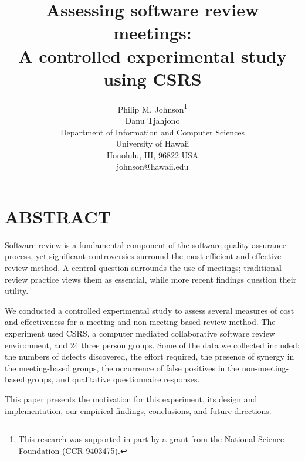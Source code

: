 



\title{Assessing software review meetings: \\ A controlled experimental study using CSRS}

\author{
        \hspace*{-4ex}
        \parbox{4.6in} {\begin{center}
        {\authornamefont Philip M. Johnson\thanks{This research was supported
in part by a grant  from the National Science Foundation (CCR-9403475).}}\\ 
        {\authornamefont Danu Tjahjono}\\
        Department of Information and Computer Sciences\\
        University of Hawaii\\
        Honolulu, HI, 96822 USA\\
        johnson@hawaii.edu
        \end{center} }
      }

\maketitle
\copyrightspace
\section{ABSTRACT}

Software review is a fundamental component of the software quality
assurance process, yet significant controversies surround the 
most efficient and effective review method. A central question
surrounds the use of meetings; traditional review practice views
them as essential, while more recent findings question their 
utility.

We conducted a controlled experimental study to assess several measures of
cost and effectiveness for a meeting and non-meeting-based review method.
The experiment used CSRS, a computer mediated collaborative software review
environment, and 24 three person groups.  Some of the data we collected
included: the numbers of defects discovered, the effort required, the
presence of synergy in the meeting-based groups, the occurrence of false
positives in the non-meeting-based groups, and qualitative questionnaire
responses.

This paper presents the motivation for this experiment, its design and
implementation, our empirical findings, conclusions, and future directions.


